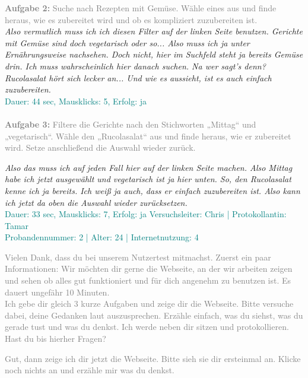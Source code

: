 \documentclass[parskip,10pt,abstracton]{scrartcl}
\begin{document}
\begin{appendix}
\textcolor{gray}{
\textbf{Aufgabe 2:} Suche nach Rezepten mit Gemüse. Wähle eines aus und finde heraus, wie es zubereitet wird und ob es kompliziert zuzubereiten ist.}\\
\textit{Also vermutlich muss ich ich diesen Filter auf der linken Seite benutzen. Gerichte mit Gemüse sind doch vegetarisch oder so... Also muss ich ja unter Ernährungsweise nachsehen. Doch nicht, hier im Suchfeld steht ja bereits Gemüse drin. Ich muss wahrscheinlich hier danach suchen. Na wer sagt's denn? Rucolasalat hört sich lecker an... Und wie es aussieht, ist es auch einfach zuzubereiten.}\\
\textcolor{teal}{Dauer: 44 sec, Mausklicks: 5, Erfolg: ja}\\\\

\textcolor{gray}{
\textbf{Aufgabe 3:} Filtere die Gerichte nach den Stichworten „Mittag“ und „vegetarisch“. Wähle den „Rucolasalat“ aus und finde heraus, wie er zubereitet wird. Setze anschließend die Auswahl wieder zurück.}

\textit{Also das muss ich auf jeden Fall hier auf der linken Seite machen. Also Mittag habe ich jetzt ausgewählt und vegetarisch ist ja hier unten. So, den Rucolasalat kenne ich ja bereits. Ich weiß ja auch, dass er einfach zuzubereiten ist. Also kann ich jetzt da oben die Auswahl wieder zurücksetzen. }\\
\textcolor{teal}{Dauer: 33 sec, Mausklicks: 7, Erfolg: ja}
%
\newpage
\textcolor{teal}{Versuchsleiter: Chris | Protokollantin: Tamar}\\
\textcolor{teal}{Probandennummer: 2 | Alter: 24 | Internetnutzung: 4}

\textcolor{gray}{
Vielen Dank, dass du bei unserem Nutzertest mitmachst.
Zuerst ein paar Informationen: Wir möchten dir gerne die Webseite, an der wir arbeiten zeigen und sehen ob alles gut funktioniert und für dich angenehm zu benutzen ist.
Es dauert ungefähr 10 Minuten. \\
Ich gebe dir gleich 3 kurze Aufgaben und zeige dir die Webseite.
Bitte versuche dabei, deine Gedanken laut auszusprechen. Erzähle einfach, was du siehst, was du gerade tust und was du denkst. Ich werde neben dir sitzen und protokollieren.
Hast du bis hierher Fragen?
}

\textcolor{gray}{
Gut, dann zeige ich dir jetzt die Webseite. Bitte sieh sie dir ersteinmal an. Klicke noch nichts an und erzähle mir was du denkst.
}


\end{appendix}
\end{document}
